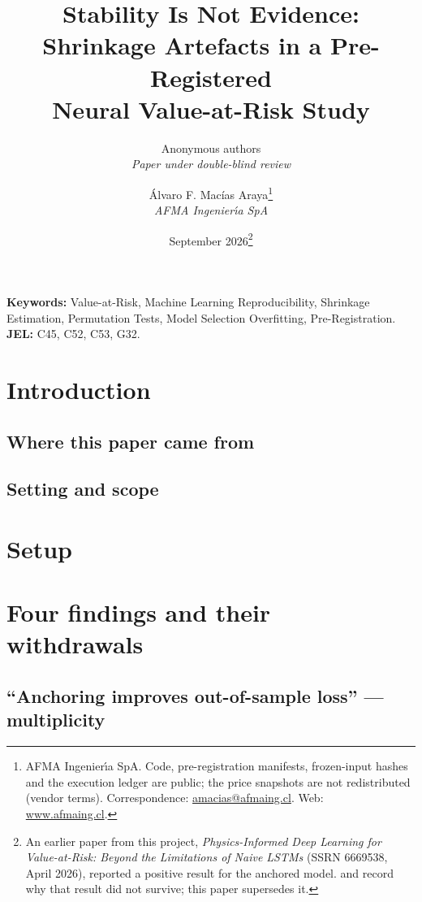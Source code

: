 \documentclass[12pt, a4paper]{article}
\title{\textbf{Stability Is Not Evidence:\\ Shrinkage Artefacts in a Pre-Registered\\ Neural Value-at-Risk Study}}
\author{Anonymous authors\\\textit{Paper under double-blind review}}
\author{%
    Álvaro F. Macías Araya\thanks{AFMA Ingenier{\'\i}a SpA. Code, pre-registration manifests,
    frozen-input hashes and the execution ledger are public; the price snapshots are not
    redistributed (vendor terms). Correspondence:
    \href{mailto:amacias@afmaing.cl}{amacias@afmaing.cl}. Web:
    \href{https://www.afmaing.cl}{www.afmaing.cl}.} \\
    \textit{AFMA Ingenier{\'\i}a SpA}
  }
\date{September 2026\thanks{An earlier paper from this project, \emph{Physics-Informed Deep Learning for Value-at-Risk: Beyond the Limitations of Naive LSTMs} (SSRN 6669538, April 2026), reported a positive result for the anchored model. \Cref{sec:provenance} and \Cref{sec:defects} record why that result did not survive; this paper supersedes it.}}
\newif\ifanonymous
\begin{document}
\maketitle

\begin{abstract}
\noindent 
\end{abstract}

\ifanonymous\else
\vspace{1em}
\noindent\textbf{Keywords:} Value-at-Risk, Machine Learning Reproducibility, Shrinkage
Estimation, Permutation Tests, Model Selection Overfitting, Pre-Registration.\\
\noindent\textbf{JEL:} C45, C52, C53, G32.
\fi

\newpage
{}

\section{Introduction}\label{sec:intro}


\subsection{Where this paper came from}\label{sec:provenance}


\subsection{Setting and scope}\label{sec:scope}


\section{Setup}\label{sec:setup}


\section{Four findings and their withdrawals}\label{sec:findings}


\subsection{``Anchoring improves out-of-sample loss'' --- multiplicity}\label{sec:multiplicity}

\end{document}
